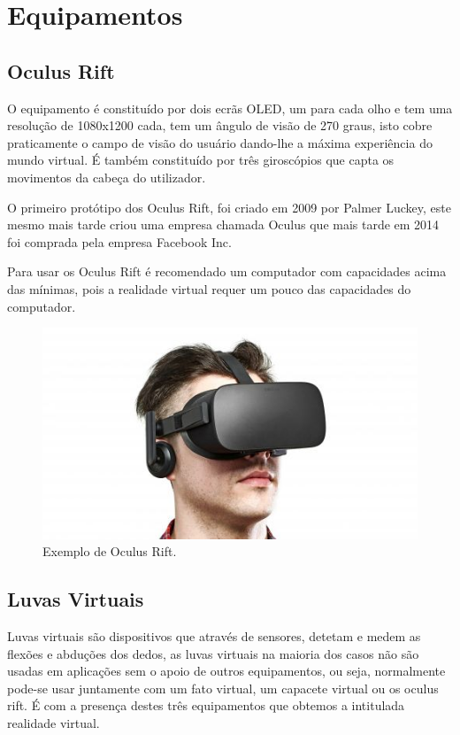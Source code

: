 \chapter{Equipamentos}

\section{Oculus Rift}

O equipamento é constituído por dois ecrãs OLED, um para cada olho e tem uma resolução de 1080x1200 cada, tem um ângulo de visão de 270 graus, isto cobre praticamente o campo de visão do usuário dando-lhe a máxima experiência do mundo virtual. É também constituído por três giroscópios que capta os movimentos da cabeça do utilizador.

O primeiro protótipo dos Oculus Rift, foi criado em 2009 por Palmer Luckey, este mesmo mais tarde criou uma empresa chamada Oculus que mais tarde em 2014 foi comprada pela empresa Facebook Inc.

Para usar os Oculus Rift é recomendado um computador com capacidades acima das mínimas, pois a realidade virtual requer um pouco das capacidades do computador.

\vspace{5mm}
\begin{figure}[h]
\center
\includegraphics[scale=0.6]{imagens/RV_OR.jpg}
\caption{Exemplo de Oculus Rift. \cite{RV_OR}}
\end{figure}
\vspace{10mm}

\section{Luvas Virtuais}
Luvas virtuais são dispositivos que através de sensores, detetam e medem as flexões e abduções dos dedos, as luvas virtuais na maioria dos casos não são usadas em aplicações sem o apoio de outros equipamentos, ou seja, normalmente pode-se usar juntamente com um fato virtual, um capacete virtual ou os oculus rift. É com a presença destes três equipamentos que obtemos a intitulada realidade virtual.

